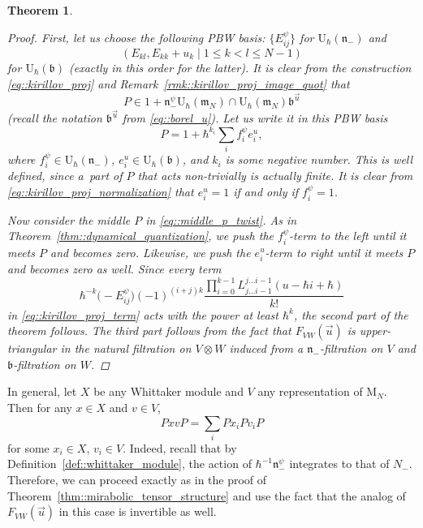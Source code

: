 \documentclass[pdftex]{sigma}
\numberwithin{equation}{section}
\newtheorem{Theorem}{Theorem}[section]
\newcommand{\U}{\mathrm{U}_{\hbar}}
\newcommand{\rM}{\mathrm{M}}
\renewcommand{\b}{\mathfrak{b}}
\newcommand{\n}{\mathfrak{n}}
\newcommand{\m}{\mathfrak{m}}
\begin{document}
\begin{Theorem}
\begin{proof}
			First, let us choose the following PBW basis: $\bigl\{E_{ij}^{\psi}\bigr\}$ for $\U(\n_-)$ and
			\[
			(E_{kl}, E_{kk} + u_k \mid 1 \leq k < l \leq N-1)
			\]
			for $\U(\b)$ (exactly in this order for the latter). It is clear from the construction \eqref{eq::kirillov_proj} and Remark~\ref{rmk::kirillov_proj_image_quot} that
			\begin{equation}
				\label{eq::kirillov_proj_normalization}
				P \in 1 + \n_-^{\psi} \U(\m_N) \cap \U(\m_N) \b^{\vec{u}}
			\end{equation}
			(recall the notation $\b^{\vec{u}}$ from \eqref{eq::borel_u}). Let us write it in this PBW basis
			\begin{equation*}
				P = 1 + \hbar^{k_i}\sum\limits_i f^{\psi}_i e_i^u,
			\end{equation*}
			where $f^{\psi}_i \in \U(\n_-)$, $e_i^u \in \U(\b)$, and $k_i$ is some negative number. This is well defined, since a~part of $P$ that acts non-trivially is actually finite. It is clear from \eqref{eq::kirillov_proj_normalization} that $e^u_i=1$ if and only if $f^{\psi}_i=1$.
			
			Now consider the middle $P$ in \eqref{eq::middle_p_twist}. As in Theorem~\ref{thm::dynamical_quantization}, we push the $f_i^{\psi}$-term to the left until it meets $P$ and becomes zero. Likewise, we push the $e_i^u$-term to right until it meets $P$ and becomes zero as well. Since every term
			\[
			\hbar^{-k} \bigl(-E_{ij}^{\psi}\bigr) (-1)^{(i+j)k} \frac{\prod_{i=0}^{k-1} L_{j \dots i-1}^{j \dots i-1}(u-\hbar i + \hbar)}{k!}
			\]
			in \eqref{eq::kirillov_proj_term} acts with the power at least $\hbar^k$, the second part of the theorem follows. The third part follows from the fact that $F_{VW}(\vec{u})$ is upper-triangular in the natural filtration on $V\otimes W$ induced from a $\n_-$-filtration on $V$ and $\b$-filtration on $W$.
		\end{proof}
	\end{Theorem}
	
	\begin{Remark}
		\label{rmk::mirabolic_tensor_structure}
		In general, let $X$ be any Whittaker module and $V$ any representation of $\rM_N$. Then for any $x\in X$ and $v\in V$,
		\[
		PxvP = \sum\limits_i Px_i P v_i P
		\]
		for some $x_i\in X$, $v_i \in V$. Indeed, recall that by Definition~\ref{def::whittaker_module}, the action of $\hbar^{-1} \n_-^{\psi}$ integrates to that of $N_-$. Therefore, we can proceed exactly as in the proof of Theorem~\ref{thm::mirabolic_tensor_structure} and use the fact that the analog of $F_{VW}(\vec{u})$ in this case is invertible as well.
	\end{Remark}
	
\end{document}

